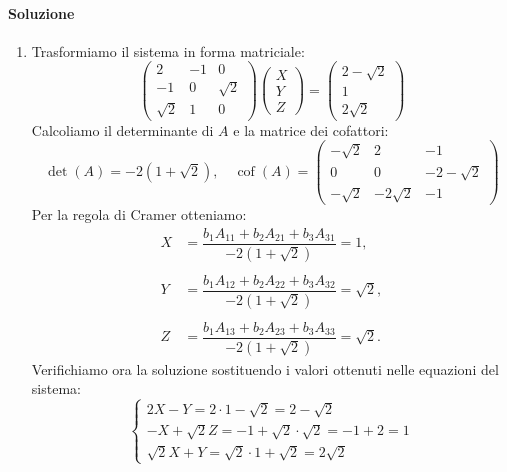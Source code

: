 \documentclass{article}
\theoremstyle{plain}
\theoremstyle{definition}
\theoremstyle{remark}
\begin{document}
\paragraph{Soluzione}
\begin{enumerate}
    \item Trasformiamo il sistema in forma matriciale:
        \[
        \begin{pmatrix}
            2 & -1 & 0\\[4mm]
            -1 & 0 & \sqrt{2}\\[4mm]
            \sqrt{2} & 1 & 0
        \end{pmatrix}
        \begin{pmatrix}
            X\\[2mm]
            Y\\[2mm]
            Z
        \end{pmatrix}=
        \begin{pmatrix}
            2-\sqrt{2}\\[2mm]
            1\\[2mm]
            2\sqrt{2}
        \end{pmatrix}\]
        Calcoliamo il determinante di $A$ e la matrice dei cofattori:
        \[
        \det(A)=-2(1+\sqrt{2}),\quad \operatorname{cof}(A)=
        \begin{pmatrix}
            -\sqrt{2} & 2 & -1\\[2mm]
            0 & 0 & -2-\sqrt{2}\\[2mm]
            -\sqrt{2} & -2\sqrt{2} & -1
        \end{pmatrix}
        \]
        Per la regola di Cramer otteniamo:
        \begin{align*}
            X &=\dfrac{b_1A_{11}+b_2A_{21}+b_3A_{31}}{-2(1+\sqrt{2})}=1,\\\\
            Y &=\dfrac{b_1A_{12}+b_2A_{22}+b_3A_{32}}{-2(1+\sqrt{2})}=\sqrt{2},\\\\
            Z &=\dfrac{b_1A_{13}+b_2A_{23}+b_3A_{33}}{-2(1+\sqrt{2})}=\sqrt{2}.
        \end{align*}
        Verifichiamo ora la soluzione sostituendo i valori ottenuti nelle equazioni del sistema:
        \[\begin{cases}
            2X-Y=2\cdot 1 - \sqrt{2} = 2-\sqrt{2}\\
            -X+\sqrt{2}Z=-1 + \sqrt{2}\cdot\sqrt{2} = -1+2 = 1\\
            \sqrt{2}X+Y=\sqrt{2}\cdot 1 + \sqrt{2} = 2\sqrt{2}

\end{cases}\]
\end{enumerate}
\end{document}
